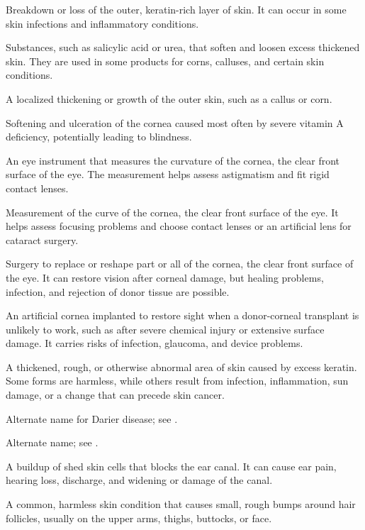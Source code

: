  Breakdown or loss of the outer, keratin-rich layer of skin. It can occur in some skin infections and inflammatory conditions.

 Substances, such as salicylic acid or urea, that soften and loosen excess thickened skin. They are used in some products for corns, calluses, and certain skin conditions.

 A localized thickening or growth of the outer skin, such as a callus or corn.

 Softening and ulceration of the cornea caused most often by severe vitamin A deficiency, potentially leading to blindness.

 An eye instrument that measures the curvature of the cornea, the clear front surface of the eye. The measurement helps assess astigmatism and fit rigid contact lenses.

 Measurement of the curve of the cornea, the clear front surface of the eye. It helps assess focusing problems and choose contact lenses or an artificial lens for cataract surgery.

 Surgery to replace or reshape part or all of the cornea, the clear front surface of the eye. It can restore vision after corneal damage, but healing problems, infection, and rejection of donor tissue are possible.

 An artificial cornea implanted to restore sight when a donor-corneal transplant is unlikely to work, such as after severe chemical injury or extensive surface damage. It carries risks of infection, glaucoma, and device problems.

 A thickened, rough, or otherwise abnormal area of skin caused by excess keratin. Some forms are harmless, while others result from infection, inflammation, sun damage, or a change that can precede skin cancer.

 Alternate name for Darier disease; see .

 Alternate name; see .

 A buildup of shed skin cells that blocks the ear canal. It can cause ear pain, hearing loss, discharge, and widening or damage of the canal.

 A common, harmless skin condition that causes small, rough bumps around hair follicles, usually on the upper arms, thighs, buttocks, or face.

